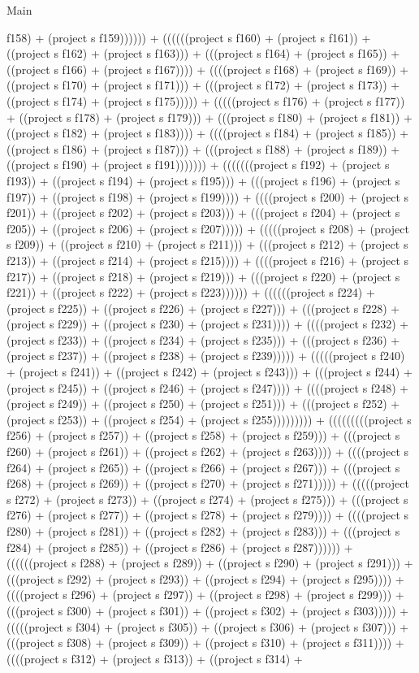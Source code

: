 \begin{lexlean}{Main}
\begin{semanticmodule}
{f158) + (project s f159)))))) + ((((((project s f160) + (project s f161)) + ((project s f162) + (project s f163))) + (((project s f164) + (project s f165)) + ((project s f166) + (project s f167)))) + ((((project s f168) + (project s f169)) + ((project s f170) + (project s f171))) + (((project s f172) + (project s f173)) + ((project s f174) + (project s f175))))) + (((((project s f176) + (project s f177)) + ((project s f178) + (project s f179))) + (((project s f180) + (project s f181)) + ((project s f182) + (project s f183)))) + ((((project s f184) + (project s f185)) + ((project s f186) + (project s f187))) + (((project s f188) + (project s f189)) + ((project s f190) + (project s f191))))))) + (((((((project s f192) + (project s f193)) + ((project s f194) + (project s f195))) + (((project s f196) + (project s f197)) + ((project s f198) + (project s f199)))) + ((((project s f200) + (project s f201)) + ((project s f202) + (project s f203))) + (((project s f204) + (project s f205)) + ((project s f206) + (project s f207))))) + (((((project s f208) + (project s f209)) + ((project s f210) + (project s f211))) + (((project s f212) + (project s f213)) + ((project s f214) + (project s f215)))) + ((((project s f216) + (project s f217)) + ((project s f218) + (project s f219))) + (((project s f220) + (project s f221)) + ((project s f222) + (project s f223)))))) + ((((((project s f224) + (project s f225)) + ((project s f226) + (project s f227))) + (((project s f228) + (project s f229)) + ((project s f230) + (project s f231)))) + ((((project s f232) + (project s f233)) + ((project s f234) + (project s f235))) + (((project s f236) + (project s f237)) + ((project s f238) + (project s f239))))) + (((((project s f240) + (project s f241)) + ((project s f242) + (project s f243))) + (((project s f244) + (project s f245)) + ((project s f246) + (project s f247)))) + ((((project s f248) + (project s f249)) + ((project s f250) + (project s f251))) + (((project s f252) + (project s f253)) + ((project s f254) + (project s f255))))))))) + (((((((((project s f256) + (project s f257)) + ((project s f258) + (project s f259))) + (((project s f260) + (project s f261)) + ((project s f262) + (project s f263)))) + ((((project s f264) + (project s f265)) + ((project s f266) + (project s f267))) + (((project s f268) + (project s f269)) + ((project s f270) + (project s f271))))) + (((((project s f272) + (project s f273)) + ((project s f274) + (project s f275))) + (((project s f276) + (project s f277)) + ((project s f278) + (project s f279)))) + ((((project s f280) + (project s f281)) + ((project s f282) + (project s f283))) + (((project s f284) + (project s f285)) + ((project s f286) + (project s f287)))))) + ((((((project s f288) + (project s f289)) + ((project s f290) + (project s f291))) + (((project s f292) + (project s f293)) + ((project s f294) + (project s f295)))) + ((((project s f296) + (project s f297)) + ((project s f298) + (project s f299))) + (((project s f300) + (project s f301)) + ((project s f302) + (project s f303))))) + (((((project s f304) + (project s f305)) + ((project s f306) + (project s f307))) + (((project s f308) + (project s f309)) + ((project s f310) + (project s f311)))) + ((((project s f312) + (project s f313)) + ((project s f314) + }
\end{semanticmodule}
\end{lexlean}

